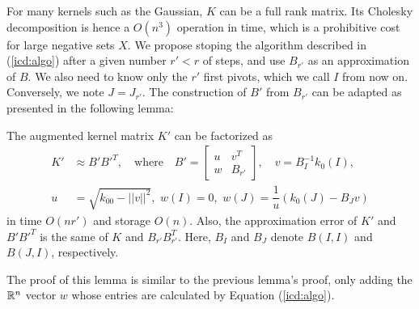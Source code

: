 For many kernels such as the Gaussian, $K$ can be a full rank matrix. Its Cholesky decomposition is hence a $O(n^3)$ operation in time, which is a prohibitive cost for large negative sets $X$. We propose stoping the algorithm described in (\ref{icd:algo}) after a given number $r'<r$ of steps, and use $B_{r'}$ as an approximation of $B$. We also need to know only the $r'$ first pivots, which we call $I$ from now on. Conversely, we note $J=J_{r'}$. The construction of $B'$ from $B_{r'}$ can be adapted as presented in the following lemma:
\begin{lemma}
The augmented kernel matrix $K'$ can be factorized as
\begin{align}
K'&\approx B'B'^T,\quad\text{where}\quad
B'=\begin{bmatrix} u & v^T\\w & B_{r'} \end{bmatrix},\quad
v=B_I^{-1} k_0(I),\\u&=\sqrt{k_{00}-||v||^2},\,\, w(I) = 0,\,\, w(J)=\dfrac{1}{u}(k_0(J)-B_Jv)
\end{align}
in time $O(nr')$ and storage $O(n)$. Also, the approximation error of $K'$ and $B'B'^T$ is the same of $K$ and $B_{r'}B_{r'}^T$. Here, $B_I$ and $B_J$ denote $B(I,I)$ and $B(J,I)$, respectively.
\end{lemma}
The proof of this lemma is similar to the previous lemma's proof, only adding the $\mathbb R^n$ vector $w$ whose entries are calculated by Equation (\ref{icd:algo}).
